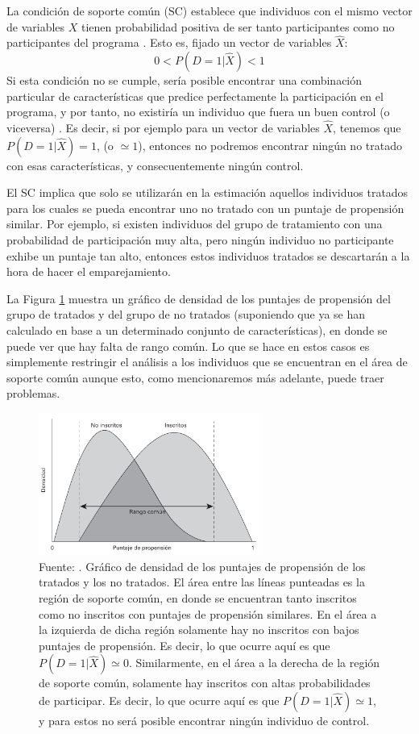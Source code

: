 \documentclass[../../main.tex]{subfiles}
\begin{document}
La condición de soporte común (SC) establece que individuos con el mismo vector de
variables \(X\) tienen probabilidad positiva de ser tanto participantes como no
participantes del programa \cite{bernal}. Esto es, fijado un vector de variables
\(\hat{X}\):
\[0 < P(D=1|\hat{X}) < 1\] Si esta condición no se cumple, sería posible encontrar una
combinación particular de características que predice perfectamente la participación en el
programa, y por tanto, no existiría un individuo que fuera un buen control (o viceversa)
\cite{bernal}. Es decir, si por ejemplo para un vector de variables \(\hat{X}\), tenemos
que \(P(D=1|\hat{X})=1\), (o \(\simeq 1\)), entonces no podremos encontrar ningún no
tratado con esas características, y consecuentemente ningún control.

El SC implica que solo se utilizarán en la estimación aquellos individuos tratados para
los cuales se pueda encontrar uno no tratado con un puntaje de propensión similar. Por
ejemplo, si existen individuos del grupo de tratamiento con una probabilidad de
participación muy alta, pero ningún individuo no participante exhibe un puntaje tan alto,
entonces estos individuos tratados se descartarán a la hora de hacer el emparejamiento.

La Figura \ref{fig:common-support} muestra un gráfico de densidad de los puntajes de
propensión del grupo de tratados y del grupo de no tratados (suponiendo que ya se han
calculado en base a un determinado conjunto de características), en donde se puede ver que
hay falta de rango común. Lo que se hace en estos casos es simplemente restringir el
análisis a los individuos que se encuentran en el área de soporte común aunque esto, como
mencionaremos más adelante, puede traer problemas.

\begin{figure}[ht]
    \centering
    \includegraphics[width=0.65\textwidth]{figs/soporte-comun.png}
    \caption{Fuente: \cite{gertler-2016}. Gráfico de densidad de los puntajes de
    propensión de los tratados y los no tratados. El área entre las líneas punteadas es la
    región de soporte común, en donde se encuentran tanto inscritos como no inscritos con
    puntajes de propensión similares. En el área a la izquierda de dicha región solamente
    hay no inscritos con bajos puntajes de propensión. Es decir, lo que ocurre aquí es que
    \(P(D=1|\hat{X}) \simeq 0\). Similarmente, en el área a la derecha de la región de
    soporte común, solamente hay inscritos con altas probabilidades de participar. Es
    decir, lo que ocurre aquí es que \(P(D=1|\hat{X}) \simeq 1\), y para estos no será
    posible encontrar ningún individuo de control.}
    \label{fig:common-support}
\end{figure}
\end{document}
